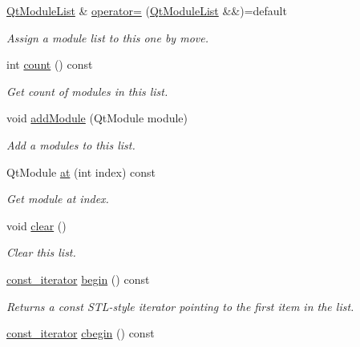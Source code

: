 \begin{DoxyCompactItemize}
\hyperlink{class_mdt_1_1_deploy_utils_1_1_qt_module_list}{Qt\+Module\+List} \& \hyperlink{class_mdt_1_1_deploy_utils_1_1_qt_module_list_ab2b5bb8309201a1e5301e595adfbc410}{operator=} (\hyperlink{class_mdt_1_1_deploy_utils_1_1_qt_module_list}{Qt\+Module\+List} \&\&)=default
\begin{DoxyCompactList}\small\item\em Assign a module list to this one by move. \end{DoxyCompactList}\item 
int \hyperlink{class_mdt_1_1_deploy_utils_1_1_qt_module_list_aa7faa888e1f35bbcb0d7eedd99949b3c}{count} () const 
\begin{DoxyCompactList}\small\item\em Get count of modules in this list. \end{DoxyCompactList}\item 
void \hyperlink{class_mdt_1_1_deploy_utils_1_1_qt_module_list_a70e3eb92aadf3192bb143b09c02b5f4e}{add\+Module} (Qt\+Module module)
\begin{DoxyCompactList}\small\item\em Add a modules to this list. \end{DoxyCompactList}\item 
Qt\+Module \hyperlink{class_mdt_1_1_deploy_utils_1_1_qt_module_list_a4efff06b2cc4dd3001ffdc64ef1adab7}{at} (int index) const 
\begin{DoxyCompactList}\small\item\em Get module at index. \end{DoxyCompactList}\item 
void \hyperlink{class_mdt_1_1_deploy_utils_1_1_qt_module_list_ad35b7ca2a64b82f63e878875ec8a6a72}{clear} ()
\begin{DoxyCompactList}\small\item\em Clear this list. \end{DoxyCompactList}\item 
\hyperlink{class_mdt_1_1_deploy_utils_1_1_qt_module_list_ad6f5d3797918d10ffcce59cf37fcd86f}{const\+\_\+iterator} \hyperlink{class_mdt_1_1_deploy_utils_1_1_qt_module_list_aace993f55fee17ebe537d43d385b525c}{begin} () const 
\begin{DoxyCompactList}\small\item\em Returns a const S\+T\+L-\/style iterator pointing to the first item in the list. \end{DoxyCompactList}\item 
\hyperlink{class_mdt_1_1_deploy_utils_1_1_qt_module_list_ad6f5d3797918d10ffcce59cf37fcd86f}{const\+\_\+iterator} \hyperlink{class_mdt_1_1_deploy_utils_1_1_qt_module_list_af6d4d9209eeb796785e9e15eaacc141e}{cbegin} () const 

\end{DoxyCompactItemize}
